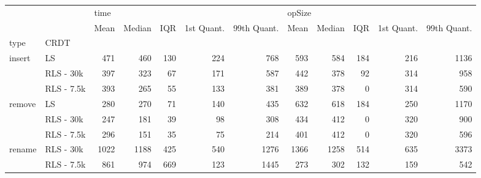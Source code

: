 \begin{tabular}{llrrrrrrrrrr}
\toprule
       &            & \multicolumn{5}{l}{time} & \multicolumn{5}{l}{opSize} \\
       &            &  Mean & Median &  IQR & 1st Quant. & 99th Quant. &   Mean & Median &  IQR & 1st Quant. & 99th Quant. \\
type & CRDT &       &        &      &            &             &        &        &      &            &             \\
\midrule
insert & LS &   471 &    460 &  130 &        224 &         768 &    593 &    584 &  184 &        216 &        1136 \\
       & RLS - 30k &   397 &    323 &   67 &        171 &         587 &    442 &    378 &   92 &        314 &         958 \\
       & RLS - 7.5k &   393 &    265 &   55 &        133 &         381 &    389 &    378 &    0 &        314 &         590 \\
remove & LS &   280 &    270 &   71 &        140 &         435 &    632 &    618 &  184 &        250 &        1170 \\
       & RLS - 30k &   247 &    181 &   39 &         98 &         308 &    434 &    412 &    0 &        320 &         900 \\
       & RLS - 7.5k &   296 &    151 &   35 &         75 &         214 &    401 &    412 &    0 &        320 &         596 \\
rename & RLS - 30k &  1022 &   1188 &  425 &        540 &        1276 &   1366 &   1258 &  514 &        635 &        3373 \\
       & RLS - 7.5k &   861 &    974 &  669 &        123 &        1445 &    273 &    302 &  132 &        159 &         542 \\
\bottomrule
\end{tabular}
